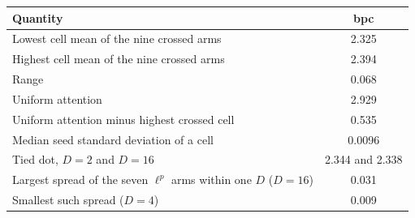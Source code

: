 \begin{tabular}{lc}
\toprule
Quantity & bpc \\
\midrule
Lowest cell mean of the nine crossed arms & 2.325 \\
Highest cell mean of the nine crossed arms & 2.394 \\
Range & 0.068 \\
Uniform attention & 2.929 \\
Uniform attention minus highest crossed cell & 0.535 \\
Median seed standard deviation of a cell & 0.0096 \\
Tied dot, $D=2$ and $D=16$ & 2.344 and 2.338 \\
Largest spread of the seven $\ell^p$ arms within one $D$ ($D=16$) & 0.031 \\
Smallest such spread ($D=4$) & 0.009 \\
\bottomrule
\end{tabular}
